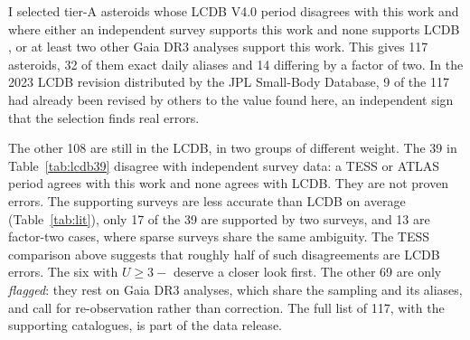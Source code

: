I selected tier-A asteroids whose LCDB V4.0 period disagrees with this work and where either an independent
survey supports this work and none supports LCDB \citep{Vavilov2025,McNeill2023,Erasmus2020}, or at least
two other Gaia DR3 analyses support this work. This gives 117 asteroids, 32 of them exact daily aliases and
14 differing by a factor of two. In the 2023 LCDB revision distributed by the JPL Small-Body Database, 9 of
the 117 had already been revised by others to the value found here, an independent sign that the selection
finds real errors.

The other 108 are still in the LCDB, in two groups of different weight. The 39 in Table~\ref{tab:lcdb39}
disagree with independent survey data: a TESS or ATLAS period agrees with this work and none agrees with
LCDB. They are not proven errors. The supporting surveys are less accurate than LCDB on average
(Table~\ref{tab:lit}), only 17 of the 39 are supported by two surveys, and 13 are factor-two cases, where
sparse surveys share the same ambiguity. The TESS comparison above suggests that roughly half of such
disagreements are LCDB errors. The six with $U\ge3-$ deserve a closer look first. The other 69 are only
\emph{flagged}: they rest on Gaia DR3 analyses, which share the sampling and its aliases, and call for
re-observation rather than correction. The full list of 117, with the supporting catalogues, is part of the
data release.

